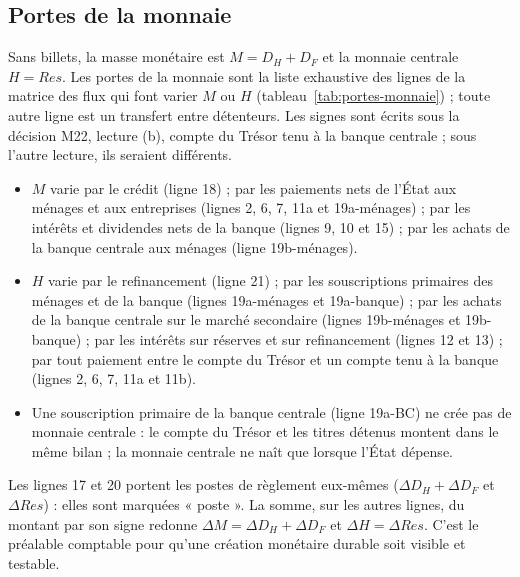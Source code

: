 \documentclass[11pt,a4paper]{article}
\begin{document}
\subsection{Portes de la monnaie}
\label{sec:cadre-portes}
Sans billets, la masse monétaire est $M = D_H + D_F$ et la monnaie centrale $H = \mathit{Res}$. Les portes de la monnaie sont la liste exhaustive des lignes de la matrice des flux qui font varier $M$ ou $H$ (tableau~\ref{tab:portes-monnaie}) ; toute autre ligne est un transfert entre détenteurs. Les signes sont écrits sous la décision M22, lecture (b), compte du Trésor tenu à la banque centrale ; sous l'autre lecture, ils seraient différents.
\begin{itemize}
\item $M$ varie par le crédit (ligne 18) ; par les paiements nets de l'État aux ménages et aux entreprises (lignes 2, 6, 7, 11a et 19a-ménages) ; par les intérêts et dividendes nets de la banque (lignes 9, 10 et 15) ; par les achats de la banque centrale aux ménages (ligne 19b-ménages).
\item $H$ varie par le refinancement (ligne 21) ; par les souscriptions primaires des ménages et de la banque (lignes 19a-ménages et 19a-banque) ; par les achats de la banque centrale sur le marché secondaire (lignes 19b-ménages et 19b-banque) ; par les intérêts sur réserves et sur refinancement (lignes 12 et 13) ; par tout paiement entre le compte du Trésor et un compte tenu à la banque (lignes 2, 6, 7, 11a et 11b).
\item Une souscription primaire de la banque centrale (ligne 19a-BC) ne crée pas de monnaie centrale : le compte du Trésor et les titres détenus montent dans le même bilan ; la monnaie centrale ne naît que lorsque l'État dépense.
\end{itemize}
Les lignes 17 et 20 portent les postes de règlement eux-mêmes ($\Delta D_H + \Delta D_F$ et $\Delta \mathit{Res}$) : elles sont marquées « poste ». La somme, sur les autres lignes, du montant par son signe redonne $\Delta M = \Delta D_H + \Delta D_F$ et $\Delta H = \Delta \mathit{Res}$. C'est le préalable comptable pour qu'une création monétaire durable soit visible et testable.
\end{document}
